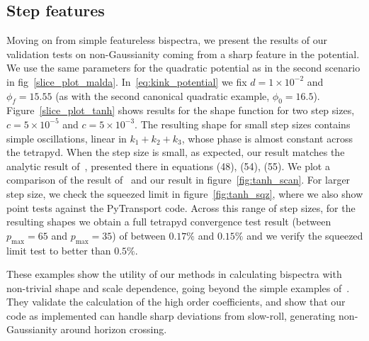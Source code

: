 \documentclass[a4paper,12pt]{extarticle}
\newcommand{\Pmax}{p_\text{max}}
\begin{document}
\subsection{Step features}
Moving on from simple featureless bispectra, we present the results of
our validation tests on non-Gaussianity coming from a sharp feature in the potential.
We use the same parameters for the quadratic potential as in the
second scenario in fig~\ref{slice_plot_malda}.
In~\eqref{eq:kink_potential}
we fix $d=1\times10^{-2}$ and $\phi_{f}=15.55$
(as with the second canonical quadratic example, $\phi_0=16.5$).
Figure~\ref{slice_plot_tanh}
shows results for the shape function for two step sizes,
$c=5\times10^{-5}$ and $c=5\times10^{-3}$.
The resulting shape for small step sizes contains simple oscillations,
linear in $k_1+k_2+k_3$,
whose phase is almost constant across the tetrapyd.
When the step size is small, as expected,
our result matches the analytic result of~\cite{adshead},
presented there in equations (48), (54), (55).
We plot a comparison of the result of~\cite{adshead} and our result
in figure~\ref{fig:tanh_scan}.
For larger step size, we check the squeezed limit in figure~\ref{fig:tanh_sqz},
where we also show point tests against the PyTransport code.
Across this range of step sizes, for the resulting shapes we obtain
a full tetrapyd convergence test result
(between $\Pmax=65$ and $\Pmax=35$)
of between $0.17\%$ and $0.15\%$ and
we verify the squeezed limit test to better than $0.5\%$.

These examples show the utility of our methods in
calculating bispectra with non-trivial shape and scale dependence,
going beyond the simple examples of~\cite{Funakoshi}.
They validate the calculation of the high order coefficients,
and show that our code as implemented can handle sharp deviations from slow-roll,
generating non-Gaussianity around horizon crossing.
\end{document}
